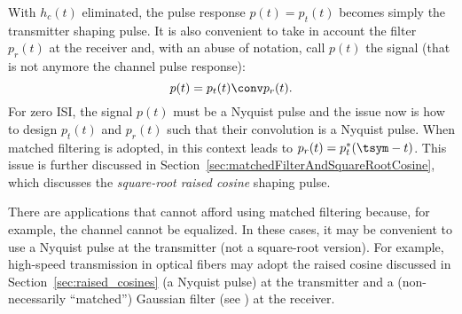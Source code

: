 

With $h_c(t)$ eliminated, the pulse response  $p(t) = p_t(t)$ becomes simply the
transmitter shaping pulse. It is also convenient to take in account the filter $p_r(t)$ at the receiver
and, with an abuse of notation, call $p(t)$ the signal (that is not anymore the channel pulse response):
\begin{equation}
p(t) = p_t(t) \conv p_r(t).
\label{eq:pulseWithEqualizedChannel}
\end{equation}
For zero ISI, the signal $p(t)$ must be a Nyquist pulse and the issue now is how
to design $p_t(t)$ and $p_r(t)$ such that their convolution is a Nyquist pulse.
When matched filtering is adopted,  in this context leads
to $p_r(t) = p_t^*(\tsym-t)$. This issue is further discussed in
Section~\ref{sec:matchedFilterAndSquareRootCosine}, which discusses the \emph{square-root raised cosine} shaping pulse.

There are applications that cannot afford using matched filtering because, for example, the channel
cannot be equalized. In these cases, it may be convenient to use a Nyquist pulse
at the transmitter (not a square-root version). For example, high-speed transmission in
optical fibers may adopt the raised cosine discussed in Section~\ref{sec:raised_cosines} (a Nyquist pulse) at the transmitter
and a (non-necessarily ``matched'') Gaussian filter (see ) at the receiver.



